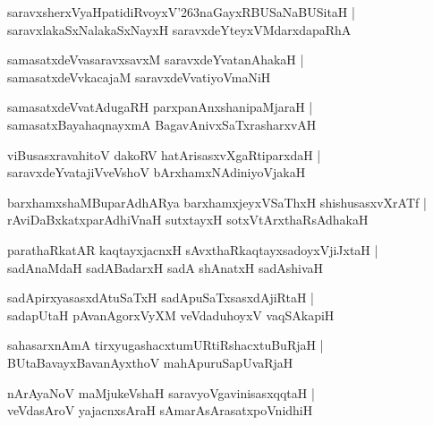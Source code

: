 \documentclass[twoside,12pt,openright]{book}
\def\S{\char'263}
\newcounter{shloka}[chapter]
\begin{document}
\begin{shloka}%
saravxsherxVyaHpatidiRvoyxV\S naGayxRBUSaNaBUSitaH |\\
saravxlakaSxNalakaSxNayxH saravxdeYteyxVMdarxdapaRhA 
\end{shloka}

\begin{shloka}%
samasatxdeVvasaravxsavxM saravxdeYvatanAhakaH |\\
samasatxdeVvkacajaM saravxdeVvatiyoVmaNiH
\end{shloka}

\begin{shloka}%
samasatxdeVvatAdugaRH parxpanAnxshanipaMjaraH |\\
samasatxBayahaqnayxmA BagavAnivxSaTxrasharxvAH 
\end{shloka}

\begin{shloka}%
viBusasxravahitoV dakoRV hatArisasxvXgaRtiparxdaH |\\
saravxdeYvatajiVveVshoV bArxhamxNAdiniyoVjakaH 
\end{shloka}

\begin{shloka}%
barxhamxshaMBuparAdhARya barxhamxjeyxVSaThxH shishusasxvXrATf |\\
rAviDaBxkatxparAdhiVnaH sutxtayxH sotxVtArxthaRsAdhakaH
\end{shloka}

\begin{shloka}%
parathaRkatAR kaqtayxjacnxH sAvxthaRkaqtayxsadoyxVjiJxtaH |\\
sadAnaMdaH sadABadarxH sadA shAnatxH sadAshivaH 
\end{shloka}

\begin{shloka}%
sadApirxyasasxdAtuSaTxH sadApuSaTxsasxdAjiRtaH |\\
sadapUtaH pAvanAgorxVyXM veVdaduhoyxV vaqSAkapiH 
\end{shloka}

\begin{shloka}%
sahasarxnAmA tirxyugashacxtumURtiRshacxtuBuRjaH |\\
BUtaBavayxBavanAyxthoV mahApuruSapUvaRjaH
\end{shloka}

\begin{shloka}%
nArAyaNoV maMjukeVshaH saravyoVgavinisasxqqtaH |\\
veVdasAroV yajacnxsAraH sAmarAsArasatxpoVnidhiH 
\end{shloka}
\end{document}

